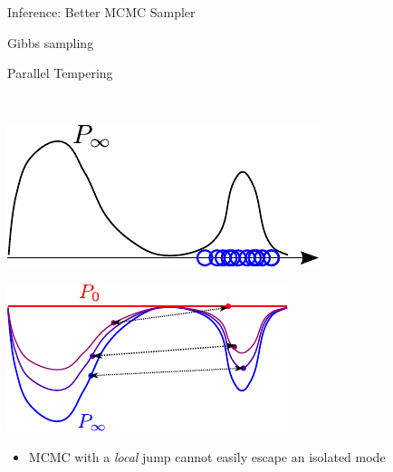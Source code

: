 \documentclass{beamer}
\begin{document}
\begin{frame}{Inference: Better MCMC Sampler}
\begin{minipage}{0.49\textwidth}
\centering
\scriptsize
Gibbs sampling
\end{minipage}
\hfill
\begin{minipage}{0.49\textwidth}
\centering
\scriptsize
Parallel Tempering
\end{minipage}
\\
\begin{minipage}{0.49\textwidth}
\centering
\includegraphics[width=.9\textwidth]{bad_inference_bm.pdf}
\end{minipage}
\hfill
\begin{minipage}{0.49\textwidth}
\centering
\includegraphics[width=.9\textwidth]{parallel_tempering.pdf}
\end{minipage}

\begin{itemize}
\item MCMC with a \emph{local} jump cannot easily escape an isolated mode
\end{itemize}


\end{frame}
\end{document}
